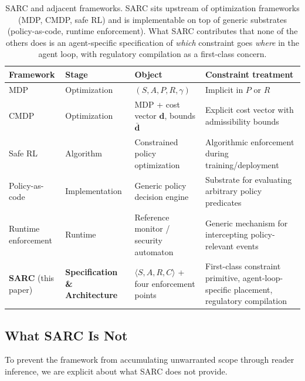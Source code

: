 \documentclass[11pt,a4paper]{article}
\theoremstyle{remark}
\begin{document}
\begin{table}[h]
\centering\footnotesize
\begin{tabularx}{\textwidth}{@{}lXXX@{}}
\toprule
\textbf{Framework} & \textbf{Stage} & \textbf{Object} & \textbf{Constraint treatment} \\
\midrule
MDP \cite{puterman1994mdp} & Optimization & $(S,A,P,R,\gamma)$ & Implicit in $P$ or $R$ \\
CMDP \cite{altman1999cmdp} & Optimization & MDP + cost vector $\mathbf{d}$, bounds $\bar{\mathbf{d}}$ & Explicit cost vector with admissibility bounds \\
Safe RL \cite{garcia2015safe,achiam2017cpo} & Algorithm & Constrained policy optimization & Algorithmic enforcement during training/deployment \\
Policy-as-code \cite{jin2017opa,baier2024policymachine} & Implementation & Generic policy decision engine & Substrate for evaluating arbitrary policy predicates \\
Runtime enforcement \cite{schneider2003enforcement,fournet2003stack} & Runtime & Reference monitor / security automaton & Generic mechanism for intercepting policy-relevant events \\
\textbf{SARC} (this paper) & \textbf{Specification \& Architecture} & $\langle S,A,R,C\rangle$ + four enforcement points & First-class constraint primitive, agent-loop-specific placement, regulatory compilation \\
\bottomrule
\end{tabularx}
\caption{SARC and adjacent frameworks. SARC sits upstream of optimization frameworks (MDP, CMDP, safe RL) and is implementable on top of generic substrates (policy-as-code, runtime enforcement). What SARC contributes that none of the others does is an agent-specific specification of \emph{which} constraint goes \emph{where} in the agent loop, with regulatory compilation as a first-class concern.}
\label{tab:comparison}
\end{table}

\subsection{What SARC Is Not}\label{sec:not}

To prevent the framework from accumulating unwarranted scope through reader inference, we are explicit about what SARC does not provide.
\end{document}
